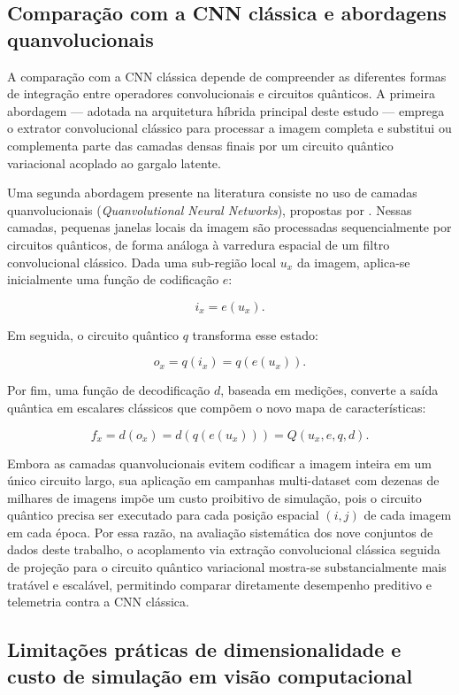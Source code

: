 \documentclass[
    12pt,
    openright,
    oneside,
    a4paper,
    english,
    brazil
]{abntex2}
\begin{document}
\subsection{Comparação com a CNN clássica e abordagens quanvolucionais}
\label{subsec:comparacao_cnn_classica}

A comparação com a CNN clássica depende de compreender as diferentes formas de integração entre operadores convolucionais e circuitos quânticos. A primeira abordagem --- adotada na arquitetura híbrida principal deste estudo --- emprega o extrator convolucional clássico para processar a imagem completa e substitui ou complementa parte das camadas densas finais por um circuito quântico variacional acoplado ao gargalo latente.

Uma segunda abordagem presente na literatura consiste no uso de camadas quanvolucionais (\textit{Quanvolutional Neural Networks}), propostas por . Nessas camadas, pequenas janelas locais da imagem são processadas sequencialmente por circuitos quânticos, de forma análoga à varredura espacial de um filtro convolucional clássico. Dada uma sub-região local \(u_x\) da imagem, aplica-se inicialmente uma função de codificação \(e\):

\[
i_x = e(u_x).
\]

Em seguida, o circuito quântico \(q\) transforma esse estado:

\[
o_x = q(i_x) = q(e(u_x)).
\]

Por fim, uma função de decodificação \(d\), baseada em medições, converte a saída quântica em escalares clássicos que compõem o novo mapa de características:

\[
f_x = d(o_x) = d(q(e(u_x))) = Q(u_x, e, q, d).
\]

Embora as camadas quanvolucionais evitem codificar a imagem inteira em um único circuito largo, sua aplicação em campanhas multi-dataset com dezenas de milhares de imagens impõe um custo proibitivo de simulação, pois o circuito quântico precisa ser executado para cada posição espacial \((i,j)\) de cada imagem em cada época. Por essa razão, na avaliação sistemática dos nove conjuntos de dados deste trabalho, o acoplamento via extração convolucional clássica seguida de projeção para o circuito quântico variacional mostra-se substancialmente mais tratável e escalável, permitindo comparar diretamente desempenho preditivo e telemetria contra a CNN clássica.

\subsection{Limitações práticas de dimensionalidade e custo de simulação em visão computacional}
\end{document}
